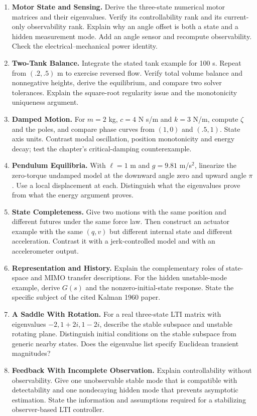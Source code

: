 \begin{enumerate}
\item \textbf{Motor State and Sensing.} Derive the three-state numerical motor matrices and their eigenvalues. Verify its controllability rank and its current-only observability rank. Explain why an angle offset is both a state and a hidden measurement mode. Add an angle sensor and recompute observability. Check the electrical--mechanical power identity.
\item \textbf{Two-Tank Balance.} Integrate the stated tank example for 100 s. Repeat from $(.2,.5)$ m to exercise reversed flow. Verify total volume balance and nonnegative heights, derive the equilibrium, and compare two solver tolerances. Explain the square-root regularity issue and the monotonicity uniqueness argument.
\item \textbf{Damped Motion.} For $m=2$ kg, $c=4$ N s/m and $k=3$ N/m, compute $\zeta$ and the poles, and compare phase curves from $(1,0)$ and $(.5,1)$. State axis units. Contrast modal oscillation, position monotonicity and energy decay; test the chapter's critical-damping counterexample.
\item \textbf{Pendulum Equilibria.} With $\ell=1$ m and $g=9.81$ m/s$^2$, linearize the zero-torque undamped model at the downward angle zero and upward angle $\pi$. Use a local displacement at each. Distinguish what the eigenvalues prove from what the energy argument proves.
\item \textbf{State Completeness.} Give two motions with the same position and different futures under the same force law. Then construct an actuator example with the same $(q,v)$ but different internal state and different acceleration. Contrast it with a jerk-controlled model and with an accelerometer output.
\item \textbf{Representation and History.} Explain the complementary roles of state-space and MIMO transfer descriptions. For the hidden unstable-mode example, derive $G(s)$ and the nonzero-initial-state response. State the specific subject of the cited Kalman 1960 paper.
\item \textbf{A Saddle With Rotation.} For a real three-state LTI matrix with eigenvalues $-2,1+2i,1-2i$, describe the stable subspace and unstable rotating plane. Distinguish initial conditions on the stable subspace from generic nearby states. Does the eigenvalue list specify Euclidean transient magnitudes?
\item \textbf{Feedback With Incomplete Observation.} Explain controllability without observability. Give one unobservable stable mode that is compatible with detectability and one nondecaying hidden mode that prevents asymptotic estimation. State the information and assumptions required for a stabilizing observer-based LTI controller.

\end{enumerate}
